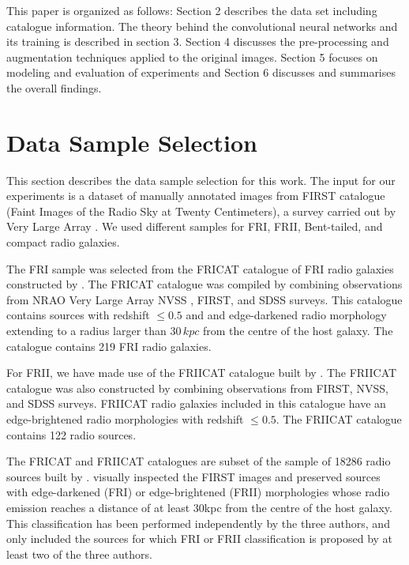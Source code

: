 \documentclass[fleqn,usenatbib]{mnras}
\begin{document}
This paper is organized as follows: Section 2 describes the data set including catalogue information. The theory behind the  convolutional neural networks and its training is described in section 3. Section 4 discusses the pre-processing and augmentation techniques applied to the original images.  Section 5 focuses on modeling and evaluation of experiments and Section 6 discusses and summarises the overall findings.
\section{Data Sample Selection}
This section describes the data sample selection for this work. The input for our experiments is a dataset of manually annotated images from FIRST catalogue (Faint Images of the Radio Sky at Twenty Centimeters), a survey carried out by Very Large Array \citep{first}. We used different samples for FRI, FRII, Bent-tailed, and compact radio galaxies.

The FRI sample was selected from the FRICAT catalogue  of FRI radio galaxies constructed by \citet{Capetti2017a}. The FRICAT catalogue was compiled by combining observations from NRAO Very Large Array NVSS \citep{Condon1998}, FIRST, and SDSS \citep{York2000} surveys. This catalogue contains sources with redshift $\leq  0.5$ and and edge-darkened radio morphology extending to a radius larger than $30\, kpc$ from the centre of the host galaxy. The catalogue contains 219 FRI radio galaxies.


For FRII, we have made use of the FRIICAT catalogue built by \citet{Capetti2017b}. The FRIICAT catalogue was also constructed by combining observations from FIRST, NVSS, and SDSS surveys. FRIICAT radio galaxies included in this catalogue have an edge-brightened radio morphologies with redshift $\leq 0.5$. The FRIICAT catalogue contains 122 radio sources.

The FRICAT and FRIICAT catalogues are subset of the sample of 18286 radio sources built by \citet{Best2012}. \citet{Capetti2017a, Capetti2017b} visually inspected the FIRST images and preserved sources with edge-darkened (FRI) or edge-brightened (FRII) morphologies  whose radio emission reaches a distance of at least 30kpc from the centre of the host galaxy. This classification has been performed independently by the three authors, and only included the sources for which FRI or FRII classification is proposed by at least two of the three authors.
\end{document}

